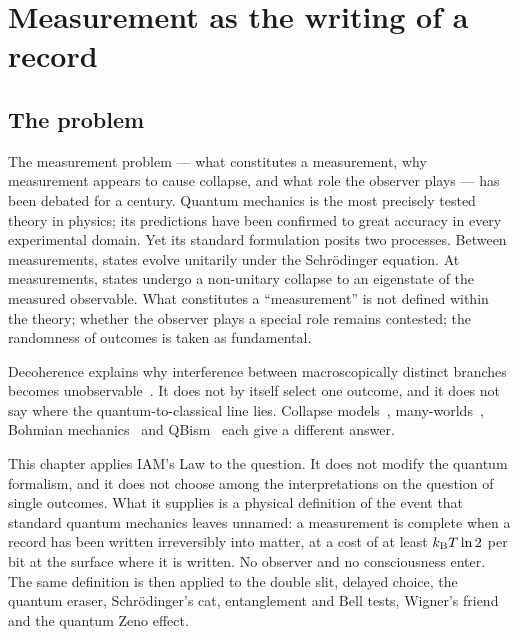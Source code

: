 \chapter{Measurement as the writing of a record}\label{ch:measurement}

\section{The problem}\label{sec:mp_problem}
The measurement problem --- what constitutes a measurement, why measurement appears to cause collapse, and what role the observer plays --- has been
debated for a century. Quantum mechanics is the most precisely tested theory in physics; its predictions have been confirmed to great accuracy in every
experimental domain. Yet its standard formulation posits two processes. Between measurements, states evolve unitarily under the Schr\"odinger equation.
At measurements, states undergo a non-unitary collapse to an eigenstate of the measured observable. What constitutes a ``measurement'' is not defined
within the theory; whether the observer plays a special role remains contested; the randomness of outcomes is taken as fundamental.

Decoherence explains why interference between macroscopically distinct branches becomes unobservable~\cite{Zurek2003,Schlosshauer2005,JoosZeh1985}. It
does not by itself select one outcome, and it does not say where the quantum-to-classical line lies. Collapse models~\cite{GRW1986,Bassi2013},
many-worlds~\cite{Everett1957}, Bohmian mechanics~\cite{Bohm1952} and QBism~\cite{Fuchs2014} each give a different answer.

This chapter applies IAM's Law to the question. It does not modify the quantum formalism, and it does not choose among the interpretations on the
question of single outcomes. What it supplies is a physical definition of the event that standard quantum mechanics leaves unnamed: a measurement is
complete when a record has been written irreversibly into matter, at a cost of at least $k_{\mathrm B} T\ln2$ per bit at the surface where it is written. No
observer and no consciousness enter. \interp{} The same definition is then applied to the double slit, delayed choice, the quantum eraser, Schr\"odinger's
cat, entanglement and Bell tests, Wigner's friend and the quantum Zeno effect.

